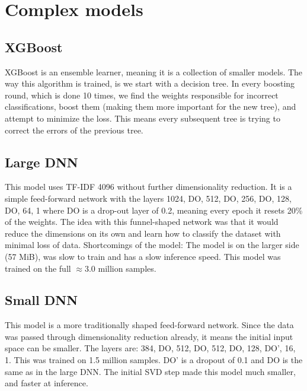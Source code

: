 \section{Complex models}
\subsection{XGBoost}
XGBoost is an ensemble learner, meaning it is a collection of smaller models. The way this algorithm is trained, is we start with a decision tree. In every boosting round, which is done 10 times, we find the weights responsible for incorrect classifications, boost them (making them more important for the new tree), and attempt to minimize the loss. This means every subsequent tree is trying to correct the errors of the previous tree.

\subsection{Large DNN}
This model uses TF-IDF 4096 without further dimensionality reduction. It is a simple feed-forward network with the
layers 1024, DO, 512, DO, 256, DO, 128, DO, 64, 1 where DO is a drop-out layer of 0.2, meaning every epoch it resets 20\%
of the weights. The idea with this funnel-shaped network was that it would reduce the dimensions on its own and learn
how to classify the dataset with minimal loss of data. Shortcomings of the model: The model is on the larger side (57 MiB), was slow to train and has a slow inference speed. This model was trained on the full $\approx 3.0$ million samples.

\subsection{Small DNN}
This model is a more traditionally shaped feed-forward network. Since the data was passed through dimensionality reduction
already, it means the initial input space can be smaller. The layers are: 384, DO, 512, DO, 512, DO, 128, DO', 16, 1. This was trained on 1.5 million samples.
DO' is a dropout of 0.1 and DO is the same as in the large DNN. The initial SVD step made this model much smaller, and faster at inference.
